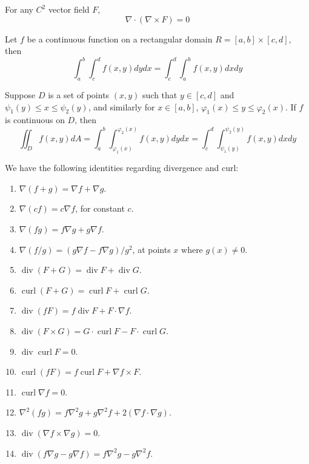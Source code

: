 \documentclass[openany]{book}
\newcommand{\diverg}{\operatorname{div}}
\newcommand{\curl}{\operatorname{curl}}
\begin{document}
\begin{prop}
    For any $C^2$ vector field $F$, 
    \begin{equation*}
        \nabla\cdot(\nabla\times F)=0
    \end{equation*}
\end{prop}



\begin{prop}
    Let $f$ be a continuous function on a rectangular domain $R=[a,b]\times[c,d]$, then 
    \begin{equation*}
        \int_a^b\int_c^df(x,y)dydx=\int_c^d\int_a^bf(x,y)dxdy
    \end{equation*}
\end{prop}

\begin{prop}
    Suppose $D$ is a set of points $(x,y)$ such that $y\in [c,d]$ and $\psi_1(y)\leq x\leq\psi_2(y)$, and similarly for $x\in [a,b]$, $\varphi_1(x)\leq y\leq\varphi_2(x)$. If $f$ is continuous on $D$, then 
    \begin{equation*}
        \iint_Df(x,y)dA=\int_a^b\int_{\varphi_1(x)}^{\varphi_2(x)}f(x,y)dydx=\int_c^d\int_{\psi_1(y)}^{\psi_2(y)}f(x,y)dxdy
    \end{equation*}
\end{prop}


\begin{prop}
    We have the following identities regarding divergence and curl: 
    \begin{enumerate}
        \item $\nabla(f+g)=\nabla f+\nabla g$.
        \item $\nabla (cf)=c\nabla f$, for constant $c$.
        \item $\nabla (fg)=f\nabla g+g\nabla f$.
        \item $\nabla (f/g)=(g\nabla f-f\nabla g)/g^2$, at points $x$ where $g(x)\neq 0$.
        \item $\diverg (F+G)=\diverg F+\diverg G$.
        \item $\curl(F+G)=\curl F+\curl G$.
        \item $\diverg(fF)=f\diverg F+F\cdot\nabla f$.
        \item $\diverg (F\times G)=G\cdot\curl F-F\cdot\curl G$.
        \item $\diverg\curl F=0$.
        \item $\curl(fF)=f\curl F+\nabla f\times F$.
        \item $\curl\nabla f=0$.
        \item $\nabla^2(fg)=f\nabla^2g+g\nabla^2f+2(\nabla f\cdot \nabla g)$.
        \item $\diverg(\nabla f\times\nabla g)=0$.
        \item $\diverg(f\nabla g-g\nabla f)=f\nabla^2g-g\nabla^2f$.
    \end{enumerate}
\end{prop}
\end{document}
